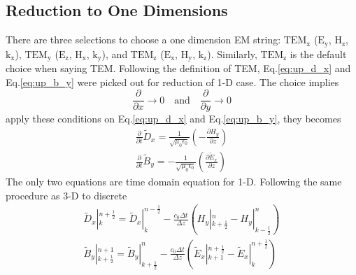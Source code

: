 \subsection{Reduction to One Dimensions}
There are three selections to choose a one dimension EM string: $\mathrm{TEM_x}$ ($\mathrm{E_{y}}$, $\mathrm{H_{z}}$,
$\mathrm{k_x}$), $\mathrm{TEM_y}$ ($\mathrm{E_z}$, $\mathrm{H_x}$, $\mathrm{k_y}$), and $\mathrm{TEM_z}$
($\mathrm{E_x}$, $\mathrm{H_y}$, $\mathrm{k_z}$). Similarly, $\mathrm{TEM_z}$ is the default choice when saying
TEM. Following the definition of TEM, Eq.\ref{eq:up_d_x} and Eq.\ref{eq:up_b_y} were picked out for reduction of 1-D
case. The choice implies
\begin{displaymath}
  \frac{\partial}{\partial x} \rightarrow 0\quad \mathrm{and} \quad
  \frac{\partial}{\partial y} \rightarrow 0
\end{displaymath}
apply these conditions on Eq.\ref{eq:up_d_x} and Eq.\ref{eq:up_b_y}, they becomes
\begin{gather}
  \frac{\partial}{\partial t}\widetilde{D}_x = \frac{1}{\sqrt{\mu_0\epsilon_0}}\left( - \frac{\partial H_y}{\partial z}\right)\\
  \frac{\partial}{\partial t}\widetilde{B}_y =-\frac{1}{\sqrt{\mu_0\epsilon_0}}\left(\frac{\partial \widetilde{E}_x}{\partial z} \right)
\end{gather}
The only two equations are time domain equation for 1-D. Following the same procedure as 3-D to discrete
\begin{gather}
  \widetilde{D}_x|_k^{n+\frac{1}{2}} = \widetilde{D}_x|_k^{n-\frac{1}{2}} - \frac{c_0\Delta t}{\Delta z}\left( H_y|_{k+\frac{1}{2}}^n - H_y|_{k-\frac{1}{2}}^n \right)\\
  \widetilde{B}_y|_{k+\frac{1}{2}}^{n+1} = \widetilde{B}_y|_{k+\frac{1}{2}}^{n} - \frac{c_0\Delta t}{\Delta z}\left( \widetilde{E}_x|_{k+1}^{n+\frac{1}{2}} - \widetilde{E}_x|_{k}^{n+\frac{1}{2}} \right)
\end{gather}



